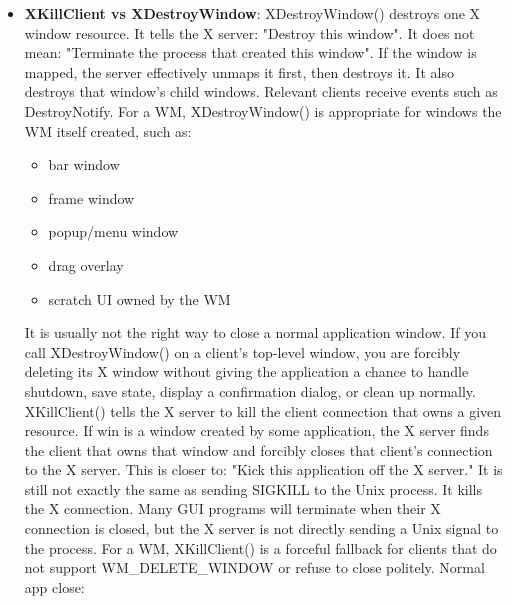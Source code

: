 \documentclass{report}
\begin{document}
\begin{itemize}
            \bigbreak \noindent
            \textbf{Errors}:
            \begin{itemize}
                \item BadValue
            \end{itemize}
        \item \textbf{XKillClient vs XDestroyWindow}: XDestroyWindow() destroys one X window resource. It tells the X server: "Destroy this window". It does not mean: "Terminate the process that created this window".
            \bigbreak \noindent 
            If the window is mapped, the server effectively unmaps it first, then destroys it. It also destroys that window’s child windows. Relevant clients receive events such as DestroyNotify. For a WM, XDestroyWindow() is appropriate for windows the WM itself created, such as:
            \begin{itemize}
                \item bar window
                \item frame window
                \item popup/menu window
                \item drag overlay
                \item scratch UI owned by the WM
            \end{itemize}
            It is usually not the right way to close a normal application window. If you call XDestroyWindow() on a client’s top-level window, you are forcibly deleting its X window without giving the application a chance to handle shutdown, save state, display a confirmation dialog, or clean up normally.
            \bigbreak \noindent 
            XKillClient() tells the X server to kill the client connection that owns a given resource. If win is a window created by some application, the X server finds the client that owns that window and forcibly closes that client’s connection to the X server.
            \bigbreak \noindent 
            This is closer to: "Kick this application off the X server."
            \bigbreak \noindent 
            It is still not exactly the same as sending SIGKILL to the Unix process. It kills the X connection. Many GUI programs will terminate when their X connection is closed, but the X server is not directly sending a Unix signal to the process.
            \bigbreak \noindent 
            For a WM, XKillClient() is a forceful fallback for clients that do not support WM\_DELETE\_WINDOW or refuse to close politely.
            \bigbreak \noindent 
            Normal app close:
            \begin{itemize}

\end{itemize}
\end{itemize}
\end{document}
